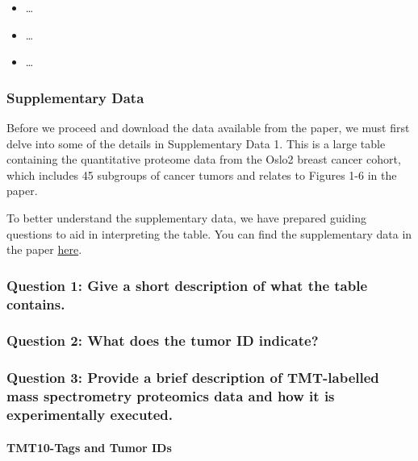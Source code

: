 \documentclass[
  letterpaper,
  DIV=11,
  numbers=noendperiod]{scrartcl}
\let\oldparagraph\paragraph
\renewcommand{\paragraph}[1]{\oldparagraph{#1}\mbox{}}
\providecommand{\tightlist}{%
  \setlength{\itemsep}{0pt}\setlength{\parskip}{0pt}}\usepackage{longtable,booktabs,array}
\begin{document}
\begin{itemize}
\tightlist
\item
  \ldots{}
\item
  \ldots{}
\item
  \ldots{}
\end{itemize}

\subsubsection{Supplementary Data}\label{supplementary-data}

Before we proceed and download the data available from the paper, we
must first delve into some of the details in Supplementary Data 1. This
is a large table containing the quantitative proteome data from the
Oslo2 breast cancer cohort, which includes 45 subgroups of cancer tumors
and relates to Figures 1-6 in the paper.

To better understand the supplementary data, we have prepared guiding
questions to aid in interpreting the table. You can find the
supplementary data in the paper
\href{https://www-nature-com.proxy1-bib.sdu.dk/articles/s41467-019-09018-y\#Sec15}{here}.

\subsubsection{Question 1: Give a short description of what the table
contains.}\label{question-1-give-a-short-description-of-what-the-table-contains.}

\subsubsection{Question 2: What does the tumor ID
indicate?}\label{question-2-what-does-the-tumor-id-indicate}

\subsubsection{Question 3: Provide a brief description of TMT-labelled
mass spectrometry proteomics data and how it is experimentally
executed.}\label{question-3-provide-a-brief-description-of-tmt-labelled-mass-spectrometry-proteomics-data-and-how-it-is-experimentally-executed.}

\paragraph{TMT10-Tags and Tumor IDs}\label{tmt10-tags-and-tumor-ids}
\end{document}
